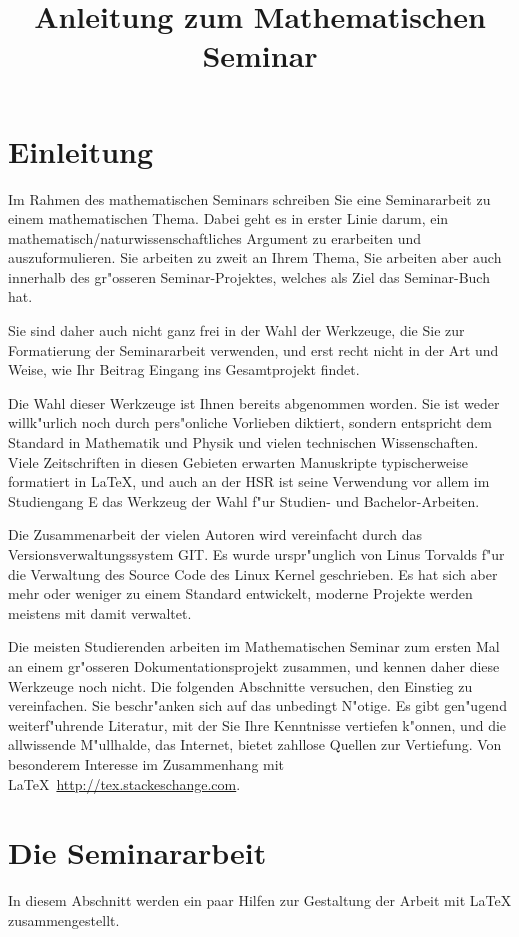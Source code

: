 \documentclass[a4paper,12pt]{article}
\begin{document}
\title{Anleitung zum Mathematischen Seminar}
\date{}
\maketitle
\section{Einleitung\label{einleitung}}
Im Rahmen des mathematischen Seminars schreiben Sie eine Seminararbeit
zu einem mathematischen Thema.
Dabei geht es in erster Linie darum, ein mathematisch/naturwissenschaftliches
Argument zu erarbeiten und auszuformulieren.
Sie arbeiten zu zweit an Ihrem Thema, Sie arbeiten aber auch 
innerhalb des gr"osseren Seminar-Projektes, welches als Ziel das
Seminar-Buch hat.

Sie sind daher auch nicht ganz frei in der Wahl der Werkzeuge, die Sie
zur Formatierung der Seminararbeit verwenden, und erst recht nicht
in der Art und Weise, wie Ihr Beitrag Eingang ins Gesamtprojekt findet.

Die Wahl dieser Werkzeuge ist Ihnen bereits abgenommen worden.
Sie ist weder willk"urlich noch durch pers"onliche Vorlieben diktiert,
sondern entspricht dem Standard in Mathematik und Physik und vielen
technischen Wissenschaften.
Viele Zeitschriften in diesen Gebieten erwarten Manuskripte typischerweise
formatiert in \LaTeX, und auch an der HSR ist seine Verwendung 
vor allem im Studiengang E das Werkzeug der Wahl f"ur Studien- und
Bachelor-Arbeiten.

Die Zusammenarbeit der vielen Autoren wird vereinfacht durch das
Versionsverwaltungssystem GIT.
Es wurde urspr"unglich von Linus Torvalds f"ur die Verwaltung des
Source Code des Linux Kernel geschrieben.
Es hat sich aber mehr oder weniger zu einem Standard entwickelt,
moderne Projekte werden meistens mit damit verwaltet.

Die meisten Studierenden arbeiten im Mathematischen Seminar zum ersten
Mal an einem gr"osseren Dokumentationsprojekt zusammen, und kennen daher
diese Werkzeuge noch nicht.
Die folgenden Abschnitte versuchen, den Einstieg zu vereinfachen.
Sie beschr"anken sich auf das unbedingt N"otige.
Es gibt gen"ugend weiterf"uhrende Literatur, mit der Sie Ihre Kenntnisse
vertiefen k"onnen, und die allwissende M"ullhalde, das Internet,
bietet zahllose Quellen zur Vertiefung.
Von besonderem Interesse im Zusammenhang mit
\LaTeX\ \url{http://tex.stackeschange.com}.

\section{Die Seminararbeit\label{seminararbeit}}
In diesem Abschnitt werden ein paar Hilfen zur Gestaltung der Arbeit
mit \LaTeX{} zusammengestellt.
\end{document}
